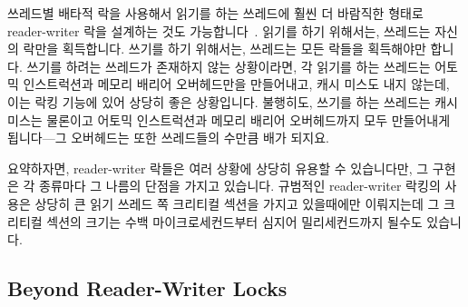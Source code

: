 쓰레드별 배타적 락을 사용해서 읽기를 하는 쓰레드에 훨씬 더 바람직한 형태로
reader-writer 락을 설계하는 것도 가능합니다~\cite{WilsonCHsieh92a}.
읽기를 하기 위해서는, 쓰레드는 자신의 락만을 획득합니다.
쓰기를 하기 위해서는, 쓰레드는 모든 락들을 획득해야만 합니다.
쓰기를 하려는 쓰레드가 존재하지 않는 상황이라면, 각 읽기를 하는 쓰레드는 어토믹
인스트럭션과 메모리 배리어 오버헤드만을 만들어내고, 캐시 미스도 내지 않는데,
이는 락킹 기능에 있어 상당히 좋은 상황입니다.
불행히도, 쓰기를 하는 쓰레드는 캐시 미스는 물론이고 어토믹 인스트럭션과 메모리
배리어 오버헤드까지 모두 만들어내게 됩니다---그 오버헤드는 또한 쓰레드들의
수만큼 배가 되지요.

요약하자면, reader-writer 락들은 여러 상황에 상당히 유용할 수 있습니다만, 그
구현은 각 종류마다 그 나름의 단점을 가지고 있습니다.
규범적인 reader-writer 락킹의 사용은 상당히 큰 읽기 쓰레드 쪽 크리티컬 섹션을
가지고 있을때에만 이뤄지는데 그 크리티컬 섹션의 크기는 수백 마이크로세컨드부터
심지어 밀리세컨드까지 될수도 있습니다.

\subsection{Beyond Reader-Writer Locks}
\label{sec:locking:Beyond Reader-Writer Locks}

